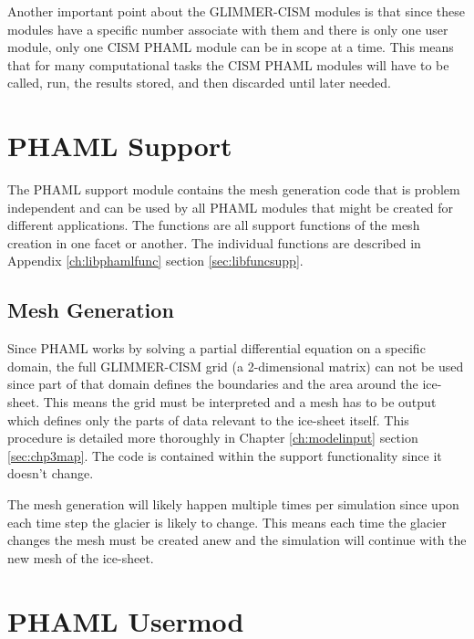 Another important point about the GLIMMER-CISM modules is that since these modules have a specific number associate with them and there is only one user module, only one CISM PHAML module can be in scope at a time.  This means that for many computational tasks the CISM PHAML modules will have to be called, run, the results stored, and then discarded until later needed.


\section{PHAML Support}\label{sec:ch4supp} 

The PHAML support module contains the mesh generation code that is problem independent and can be used by all PHAML modules that might be created for different applications.  The functions are all support functions of the mesh creation in one facet or another.  The individual functions are described in Appendix \ref{ch:libphamlfunc} section \ref{sec:libfuncsupp}.


\subsection{Mesh Generation}

Since PHAML works by solving a partial differential equation on a specific domain, the full GLIMMER-CISM grid (a 2-dimensional matrix) can not be used since part of that domain defines the boundaries and the area around the ice-sheet.  This means the grid must be interpreted and a mesh has to be output which defines only the parts of data relevant to the ice-sheet itself.  This procedure is detailed more thoroughly in Chapter \ref{ch:modelinput} section \ref{sec:chp3map}.  The code is contained within the support functionality since it doesn't change.  

The mesh generation will likely happen multiple times per simulation since upon each time step the glacier is likely to change.  This means each time the glacier changes the mesh must be created anew and the simulation will continue with the new mesh of the ice-sheet.


\section{PHAML Usermod}\label{sec:ch4usermod}

